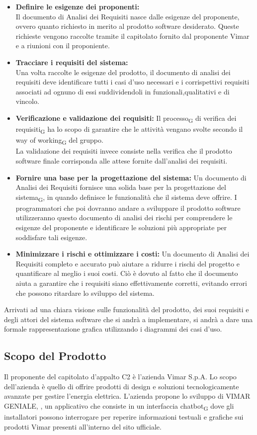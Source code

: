 \begin{itemize}
    \item \textbf{Definire le esigenze dei proponenti:} \\
    Il documento di Analisi dei Requisiti nasce dalle esigenze del proponente, ovvero quanto richiesto in merito al prodotto software desiderato. Queste richieste vengono raccolte tramite il capitolato fornito dal proponente Vimar e a riunioni con il proponiente.
    \item \textbf{Tracciare i requisiti del sistema:} \\
    Una volta raccolte le esigenze del prodotto, il documento di analisi dei requisiti deve identificare tutti i casi d'uso necessari e i corrispettivi requisiti associati  ad ognuno di essi suddividendoli in funzionali,qualitativi e di vincolo.
    \item \textbf{Verificazione e validazione dei requisiti:}
    Il processo\textsubscript{G} di verifica dei requisiti\textsubscript{G} ha lo scopo di garantire che le attività vengano svolte secondo il way of working\textsubscript{G} del gruppo.\\
    La validazione dei requisiti invece consiste nella verifica che il prodotto software finale corrisponda alle attese fornite dall'analisi dei requisiti.
    \item \textbf{Fornire una base per la progettazione del sistema:}
    Un documento di Analisi dei Requisiti fornisce una solida base per la progettazione del sistema\textsubscript{G}, in quando definisce le funzionalità che il sistema deve offrire. I programmatori che poi dovranno andare a sviluppare il prodotto software utilizzeranno questo documento di analisi dei rischi per comprendere le esigenze del proponente e identificare le soluzioni più appropriate per soddisfare tali esigenze. 
    \item \textbf{Minimizzare i rischi e ottimizzare i costi:}
    Un documento di Analisi dei Requisiti completo e accurato può aiutare a ridurre i rischi del progetto e quantificare al meglio i suoi costi. Ciò è dovuto al fatto che il documento aiuta a garantire che i requisiti siano effettivamente corretti, evitando errori che possono ritardare lo sviluppo del sistema.
\end{itemize}
Arrivati ad una chiara visione sulle funzionalità del prodotto, dei suoi requisiti e degli attori del sistema software che si andrà a implementare, si andrà a dare una formale rappresentazione grafica utilizzando i diagrammi dei casi d'uso.
\subsection{Scopo del Prodotto} 
Il proponente del capitolato d'appalto C2 è l'azienda Vimar S.p.A. Lo scopo dell'azienda è quello di offrire prodotti di design e soluzioni tecnologicamente avanzate per gestire l'energia elettrica. L'azienda propone lo sviluppo di VIMAR GENIALE, , un applicativo che consiste in un interfaccia chatbot\textsubscript{G} dove gli installatori possono
interrogare per reperire informazioni testuali e grafiche sui prodotti Vimar presenti all’interno del
sito ufficiale.

